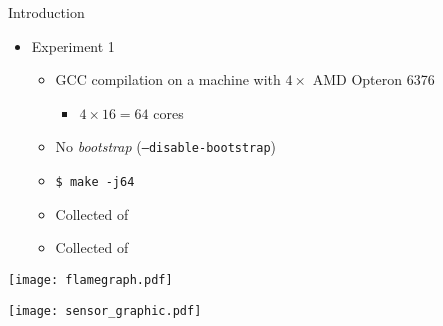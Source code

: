 \begin{frame}{Introduction}
    \begin{itemize}
        \item Experiment 1
        \begin{itemize}
            \item GCC compilation on a machine with $4\times$ AMD Opteron 6376
                \begin{itemize}
                    \item $4 \times 16 = 64$ cores
                \end{itemize}
            \item No \textit{bootstrap} (\texttt{--disable-bootstrap})
            \item \texttt{\$ make -j64}
            \item Collected {\color{blue}{Compilation Time}} of {\color{red}{each file}}
            \item Collected {\color{blue}{Consumed Energy}} of {\color{red}{all CPUs}}
        \end{itemize}
    \end{itemize}
\end{frame}

\begin{frame}
    \texttt{[image: flamegraph.pdf]}
    \label{fig:analysis_classical}
\end{frame}

\begin{frame}
    \centering
    \texttt{[image: sensor\_graphic.pdf]}
    \label{fig:sensor_graphic}
\end{frame}


